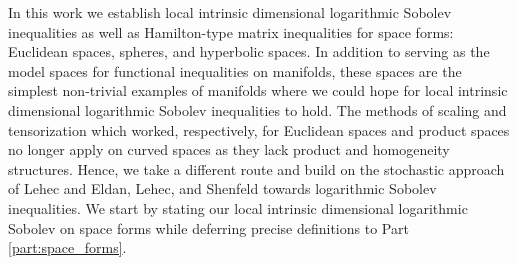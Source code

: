 \documentclass[a4paper,twoside,11pt,reqno]{amsart}
\begin{document}
In this work we establish local intrinsic dimensional logarithmic Sobolev inequalities as well as Hamilton-type matrix inequalities for space forms: Euclidean spaces, spheres, and hyperbolic spaces. In addition to serving as the model spaces for functional inequalities on manifolds, these spaces are the simplest non-trivial examples of manifolds  where we could hope for local intrinsic dimensional logarithmic Sobolev inequalities to hold. The methods of scaling and tensorization which worked, respectively, for Euclidean spaces and product spaces no longer apply on curved spaces as they lack product and homogeneity structures. Hence, we take a different route and build on the stochastic approach of Lehec  \cite{Leh13,Leh17} and Eldan, Lehec, and Shenfeld \cite{ELS20} towards logarithmic Sobolev inequalities. We start by stating our local intrinsic dimensional logarithmic Sobolev on space forms while deferring precise definitions to Part \ref{part:space_forms}.
\end{document}
